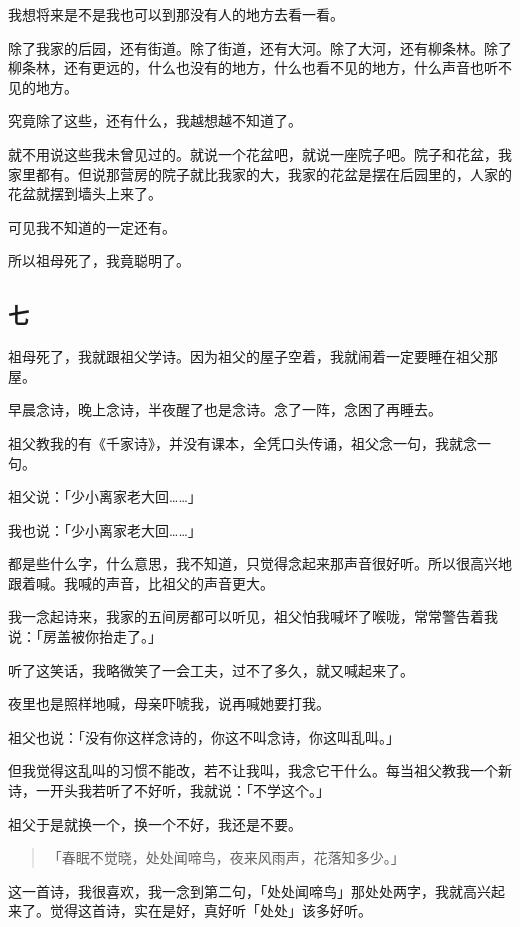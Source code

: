 \documentclass[UTF8]{ctexart}
\begin{document}
{我想将来是不是我也可以到那没有人的地方去看一看。}

除了我家的后园，还有街道。除了街道，还有大河。除了大河，还有柳条林。除了柳条林，还有更远的，什么也没有的地方，什么也看不见的地方，什么声音也听不见的地方。

究竟除了这些，还有什么，我越想越不知道了。

就不用说这些我未曾见过的。就说一个花盆吧，就说一座院子吧。院子和花盆，我家里都有。但说那营房的院子就比我家的大，我家的花盆是摆在后园里的，人家的花盆就摆到墙头上来了。

可见我不知道的一定还有。

所以祖母死了，我竟聪明了。

\subsection{七}

祖母死了，我就跟祖父学诗。因为祖父的屋子空着，我就闹着一定要睡在祖父那屋。

早晨念诗，晚上念诗，半夜醒了也是念诗。念了一阵，念困了再睡去。

祖父教我的有《千家诗》，并没有课本，全凭口头传诵，祖父念一句，我就念一句。

祖父说：「少小离家老大回……」

我也说：「少小离家老大回……」

都是些什么字，什么意思，我不知道，只觉得念起来那声音很好听。所以很高兴地跟着喊。我喊的声音，比祖父的声音更大。

我一念起诗来，我家的五间房都可以听见，祖父怕我喊坏了喉咙，常常警告着我说：「房盖被你抬走了。」

听了这笑话，我略微笑了一会工夫，过不了多久，就又喊起来了。

夜里也是照样地喊，母亲吓唬我，说再喊她要打我。

祖父也说：「没有你这样念诗的，你这不叫念诗，你这叫乱叫。」

但我觉得这乱叫的习惯不能改，若不让我叫，我念它干什么。每当祖父教我一个新诗，一开头我若听了不好听，我就说：「不学这个。」

祖父于是就换一个，换一个不好，我还是不要。

\begin{verse}
    「春眠不觉晓，处处闻啼鸟，夜来风雨声，花落知多少。」
\end{verse}


这一首诗，我很喜欢，我一念到第二句，「处处闻啼鸟」那处处两字，我就高兴起来了。觉得这首诗，实在是好，真好听「处处」该多好听。
\end{document}
